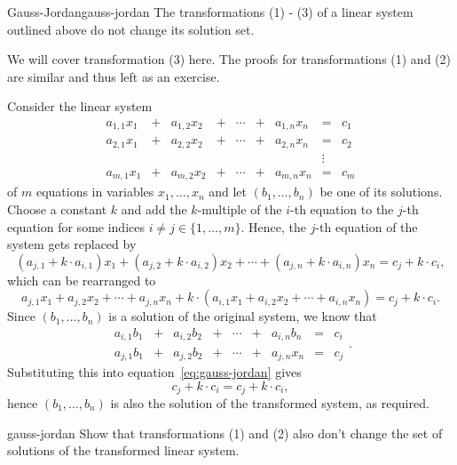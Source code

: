 \begin{theorem}{Gauss-Jordan}{gauss-jordan}
 The transformations (1) - (3) of a linear system outlined above do not change
 its solution set.
\end{theorem}
\begin{thmproof}
 We will cover transformation (3) here. The proofs for transformations (1) and
 (2) are similar and thus left as an exercise.

 Consider the linear system
 \[
  \begin{array}{rcrcccrcr}
   a_{1,1}x_1 & + & a_{1,2}x_2 & + & \cdots & + & a_{1,n}x_n & = & c_1\\
   a_{2,1}x_1 & + & a_{2,2}x_2 & + & \cdots & + & a_{2,n}x_n & = & c_2\\
              &   &            &   &        &   &            & \vdots &\\
   a_{m,1}x_1 & + & a_{m,2}x_2 & + & \cdots & + & a_{m,n}x_n & = & c_m
  \end{array}
 \]
 of $m$ equations in variables $x_1,\ldots,x_n$ and let $(b_1,\ldots,b_n)$ be
 one of its solutions. Choose a constant $k$ and add the $k$-multiple of the
 $i$-th equation to the $j$-th equation for some indices $i \neq j \in
 \{1,\ldots,m\}$. Hence, the $j$-th equation of the system gets replaced by
 \[
  (a_{j,1} + k \cdot a_{i,1})x_1 + (a_{j,2} + k \cdot a_{i,2})x_2 + \cdots +
  (a_{j,n} + k \cdot a_{i,n})x_n = c_j + k \cdot c_i,
 \]
 which can be rearranged to
 \begin{equation}
  \label{eq:gauss-jordan}
  a_{j,1}x_1 + a_{j,2}x_2 + \cdots + a_{j,n}x_n + k \cdot (a_{i,1}x_1 +
  a_{i,2}x_2 + \cdots + a_{i,n}x_n) = c_j + k \cdot c_i.
 \end{equation}
 Since $(b_1,\ldots,b_n)$ is a solution of the original system, we know that
 \[
  \begin{array}{rcrcccrcr}
   a_{i,1}b_1 & + & a_{i,2}b_2 & + & \cdots & + & a_{i,n}b_n & = & c_i\\
   a_{j,1}b_1 & + & a_{j,2}b_2 & + & \cdots & + & a_{j,n}x_n & = & c_j
  \end{array}.
 \]
 Substituting this into equation~\eqref{eq:gauss-jordan} gives
 \[
  c_j + k \cdot c_i = c_j + k \cdot c_i,
 \]
 hence $(b_1,\ldots,b_n)$ is also the solution of the transformed system, as
 required.
\end{thmproof}

\begin{exercise}{}{gauss-jordan}
 Show that transformations (1) and (2) also don't change the set of solutions of
 the transformed linear system.
\end{exercise}

